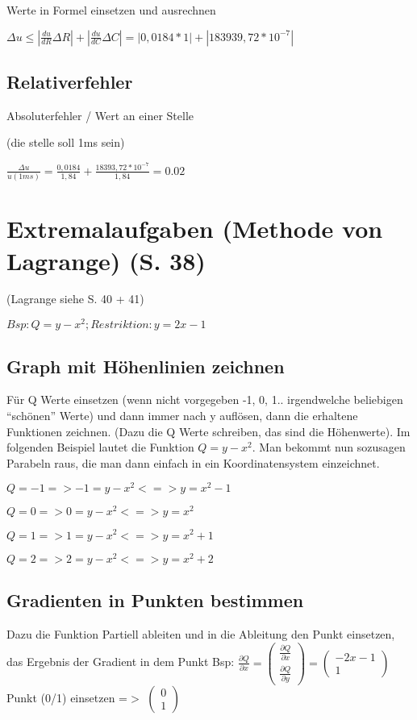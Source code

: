 \documentclass[a4paper, 11pt]{article}
\begin{document}
Werte in Formel einsetzen und ausrechnen

$\Delta u \leq |\frac {du} {dR} \Delta R |+| \frac {du} {dC} \Delta C| = |
0,0184 * 1 |+| 183939,72 * 10^{-7}|$

\subsection { Relativerfehler}

Absoluterfehler / Wert an einer Stelle

(die stelle soll 1ms sein)

$\frac{\Delta u}{u(1ms)} = \frac {0,0184} {1,84} + \frac {18393,72* 10^{-7}}
{1,84} = 0.02 $

\newpage
\section{Extremalaufgaben (Methode von Lagrange) (S. 38)}
(Lagrange siehe S. 40 + 41)

$Bsp: Q = y - x^2; Restriktion: y = 2x - 1 $

\subsection{Graph mit Höhenlinien zeichnen}

Für Q Werte einsetzen (wenn nicht vorgegeben -1, 0, 1.. irgendwelche beliebigen
``schönen'' Werte) und dann immer nach y auflösen, dann die erhaltene Funktionen
zeichnen. (Dazu die Q Werte schreiben, das sind die Höhenwerte). Im folgenden
Beispiel lautet die Funktion $Q = y - x^2$. Man bekommt nun sozusagen Parabeln
raus, die man dann einfach in ein Koordinatensystem einzeichnet. \newline

$Q = -1 => -1 = y - x^2 <=> y = x^2 -1$

$Q = 0 => 0 = y - x^2 <=> y = x^2$

$Q = 1 => 1 = y - x^2 <=> y = x^2 +1$

$Q = 2 => 2 = y - x^2 <=> y = x^2 +2$


\subsection{Gradienten in Punkten bestimmen}

Dazu die Funktion Partiell ableiten und in die Ableitung den Punkt einsetzen,
das Ergebnis der Gradient in dem Punkt \newline
Bsp: $\frac{\partial Q}{\partial x} = 
\begin{pmatrix}
	\frac{\partial Q}{\partial x} \\
	\frac{\partial Q}{\partial y}
\end{pmatrix}
=  
\begin{pmatrix} 
	-2x-1 \\
	1
\end{pmatrix}$ \newline
\newline
Punkt (0/1) einsetzen =$>$ 
$\begin{pmatrix}
	0\\
	1
\end{pmatrix}$ 
\end{document}
